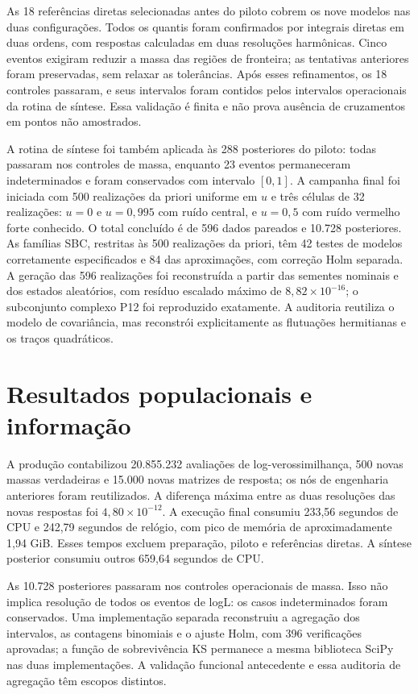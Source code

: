As 18 referências diretas selecionadas antes do piloto cobrem os nove modelos nas duas configurações. Todos os quantis foram confirmados por integrais diretas em duas ordens, com respostas calculadas em duas resoluções harmônicas. Cinco eventos exigiram reduzir a massa das regiões de fronteira; as tentativas anteriores foram preservadas, sem relaxar as tolerâncias. Após esses refinamentos, os 18 controles passaram, e seus intervalos foram contidos pelos intervalos operacionais da rotina de síntese. Essa validação é finita e não prova ausência de cruzamentos em pontos não amostrados.

A rotina de síntese foi também aplicada às 288 posteriores do piloto: todas passaram nos controles de massa, enquanto 23 eventos permaneceram indeterminados e foram conservados com intervalo $[0,1]$. A campanha final foi iniciada com 500 realizações da priori uniforme em $u$ e três células de 32 realizações: $u=0$ e $u=0{,}995$ com ruído central, e $u=0{,}5$ com ruído vermelho forte conhecido. O total concluído é de 596 dados pareados e 10.728 posteriores. As famílias SBC, restritas às 500 realizações da priori, têm 42 testes de modelos corretamente especificados e 84 das aproximações, com correção Holm separada. A geração das 596 realizações foi reconstruída a partir das sementes nominais e dos estados aleatórios, com resíduo escalado máximo de $8{,}82\times10^{-16}$; o subconjunto complexo P12 foi reproduzido exatamente. A auditoria reutiliza o modelo de covariância, mas reconstrói explicitamente as flutuações hermitianas e os traços quadráticos.

\section{Resultados populacionais e informação}

A produção contabilizou 20.855.232 avaliações de log-verossimilhança, 500 novas massas verdadeiras e 15.000 novas matrizes de resposta; os nós de engenharia anteriores foram reutilizados. A diferença máxima entre as duas resoluções das novas respostas foi $4{,}80\times10^{-12}$. A execução final consumiu 233,56 segundos de CPU e 242,79 segundos de relógio, com pico de memória de aproximadamente 1,94 GiB. Esses tempos excluem preparação, piloto e referências diretas. A síntese posterior consumiu outros 659,64 segundos de CPU.

As 10.728 posteriores passaram nos controles operacionais de massa. Isso não implica resolução de todos os eventos de logL: os casos indeterminados foram conservados. Uma implementação separada reconstruiu a agregação dos intervalos, as contagens binomiais e o ajuste Holm, com 396 verificações aprovadas; a função de sobrevivência KS permanece a mesma biblioteca SciPy nas duas implementações. A validação funcional antecedente e essa auditoria de agregação têm escopos distintos.

